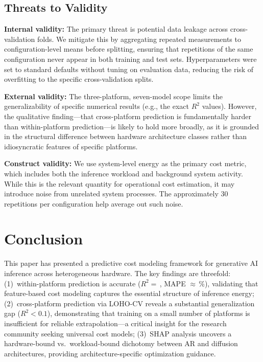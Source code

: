 \documentclass{ieeeaccess}
\begin{document}
\subsection{Threats to Validity}
\label{sec:threats}

\textbf{Internal validity:}
The primary threat is potential data leakage across cross-validation folds.
We mitigate this by aggregating repeated measurements to configuration-level means before splitting, ensuring that repetitions of the same configuration never appear in both training and test sets.
Hyperparameters were set to standard defaults without tuning on evaluation data, reducing the risk of overfitting to the specific cross-validation splits.

\textbf{External validity:}
The three-platform, seven-model scope limits the generalizability of specific numerical results (e.g., the exact $R^2$ values).
However, the qualitative finding---that cross-platform prediction is fundamentally harder than within-platform prediction---is likely to hold more broadly, as it is grounded in the structural difference between hardware architecture classes rather than idiosyncratic features of specific platforms.

\textbf{Construct validity:}
We use system-level energy as the primary cost metric, which includes both the inference workload and background system activity.
While this is the relevant quantity for operational cost estimation, it may introduce noise from unrelated system processes.
The approximately 30 repetitions per configuration help average out such noise.


\section{Conclusion}
\label{sec:conclusion}

This paper has presented a predictive cost modeling framework for generative AI inference across heterogeneous hardware.
The key findings are threefold:
(1)~within-platform prediction is accurate ($R^2 {=}$\,\unskip, MAPE ${\approx}$\,\unskip\%), validating that feature-based cost modeling captures the essential structure of inference energy;
(2)~cross-platform prediction via LOHO-CV reveals a substantial generalization gap ($R^2 {<} 0.1$), demonstrating that training on a small number of platforms is insufficient for reliable extrapolation---a critical insight for the research community seeking universal cost models;
(3)~SHAP analysis uncovers a hardware-bound vs.\ workload-bound dichotomy between AR and diffusion architectures, providing architecture-specific optimization guidance.
\end{document}
